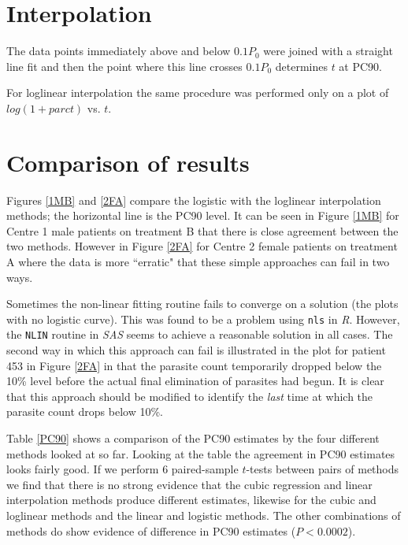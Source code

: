 \section{Interpolation}
The data points immediately above and below $0.1P_0$ were joined with a straight line fit and then the point where this line crosses $0.1P_0$ determines $t$ at PC90.

For loglinear interpolation the same procedure was performed only on a plot of $log(1+parct)$ vs. $t$.
\section{Comparison of results}
Figures \ref{1MB} and \ref{2FA} compare the logistic with the loglinear interpolation methods; the horizontal line is the PC90 level. It can be seen in Figure \ref{1MB} for Centre 1 male patients on treatment B that there is close agreement between the two methods. However in Figure \ref{2FA} for Centre 2 female patients on treatment A where the data is more ``erratic" that these simple approaches can fail in two ways.

Sometimes the non-linear fitting routine fails to converge on a solution (the plots with no logistic curve). This was found to be a problem using \texttt{nls} in \emph{R}. However, the \texttt{NLIN} routine in \emph{SAS} seems to achieve a reasonable solution in all cases. The second way in which this approach can fail is illustrated in the plot for patient 453 in Figure \ref{2FA} in that the parasite count temporarily dropped below the 10\% level before the actual final elimination of parasites had begun. It is clear that this approach should be modified to identify the \emph{last} time at which the parasite count drops below 10\%.

Table \ref{PC90} shows a comparison of the PC90 estimates by the four different methods looked at so far. Looking at the table the agreement in PC90 estimates looks fairly good. If we perform 6 paired-sample $t$-tests between pairs of methods we find that there is no strong evidence that the cubic regression and linear interpolation methods produce different estimates, likewise for the cubic and loglinear methods and the linear and logistic methods. The other combinations of methods do show evidence of difference in PC90 estimates ($P<0.0002$).

